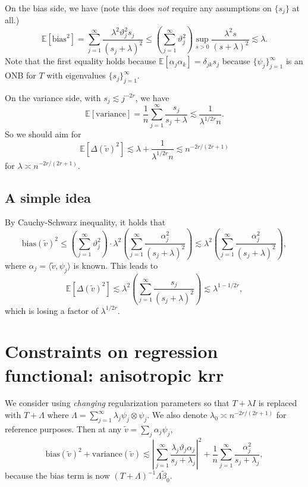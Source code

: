 \documentclass[11pt,a4paper]{article}
\renewcommand{\tilde}{\widetilde}
\theoremstyle{definition}
\theoremstyle{plain}
\theoremstyle{remark}
\begin{document}
On the bias side, we have (note this does \emph{not} require any assumptions on $\{s_j\}$ at all.)
$$
\mathbb E[\text{bias}^2] = \sum_{j=1}^{\infty} \frac{\lambda^2 \vartheta_j^2 s_j}{(s_j+\lambda)^2} \leq \left(\sum_{j=1}^{\infty}\vartheta_j^2\right)\sup_{s>0}\frac{\lambda^2 s}{(s+\lambda)^2} \lesssim \lambda.
$$
Note that the first equality holds because $\mathbb E[\alpha_j\alpha_k]=\delta_{jk}s_j$ because $\{\psi_j\}_{j=1}^{\infty}$ is an ONB for $T$ with eigenvalues $\{s_j\}_{j=1}^{\infty}$.

On the variance side, with $s_j\lesssim j^{-2r}$, we have
$$
\mathbb E[\text{variance}] = \frac{1}{n}\sum_{j=1}^{\infty} \frac{s_j}{s_j+\lambda} \lesssim \frac{1}{\lambda^{1/2r}n}.
$$
So we should aim for
$$
\mathbb E[\Delta(\tilde v)^2] \lesssim \lambda + \frac{1}{\lambda^{1/2r}n} \lesssim n^{-2r/(2r+1)}
$$
for $\lambda \asymp n^{-2r/(2r+1)}$.

\subsection{A simple idea}

By Cauchy-Schwarz inequality, it holds that
$$
\mathrm{bias}(\tilde v)^2 \leq \left(\sum_{j=1}^{\infty}\vartheta_j^2\right)\cdot \lambda^2\left(\sum_{j=1}^{\infty} \frac{\alpha_j^2}{(s_j+\lambda)^2}\right) \lesssim \lambda^2\left(\sum_{j=1}^{\infty} \frac{\alpha_j^2}{(s_j+\lambda)^2}\right),
$$
where $\alpha_j = \langle\tilde v,\psi_j\rangle$ is known. This leads to
$$
\mathbb E[\Delta(\tilde v)^2] \lesssim \lambda^2\left(\sum_{j=1}^{\infty}\frac{s_j}{(s_j+\lambda)^2}\right) \lesssim \lambda^{1-1/2r},
$$
which is losing a factor of $\lambda^{1/2r}$.

\section{Constraints on regression functional: anisotropic krr}

We consider using \emph{changing} regularization parameters so that $T+\lambda I$ is replaced with $T+\Lambda$ where $\Lambda =\sum_{j=1}^{\infty} \lambda_j \psi_j\otimes\psi_j$.
We also denote $\lambda_0 \asymp n^{-2r/(2r+1)}$ for reference purposes. Then at any $\tilde v=\sum_j\alpha_j\psi_j$, 
$$
\text{bias}(\tilde v)^2+\text{variance}(\tilde v) \lesssim \left|\sum_{j=1}^{\infty}\frac{\lambda_j\vartheta_j\alpha_j}{s_j+\lambda_j}\right|^2 + \frac{1}{n}\sum_{j=1}^{\infty}\frac{\alpha_j^2}{s_j+\lambda_j},
$$
because the bias term is now $(T+\Lambda)^{-1}\Lambda\tilde\beta_0$.
\end{document}
